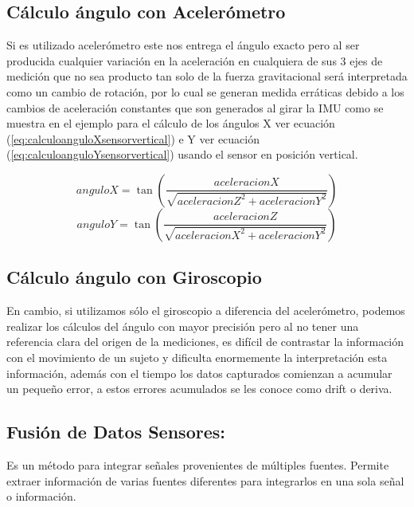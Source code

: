 \documentclass[12pt,a4paper]{article}
\begin{document}
\subsection{Cálculo ángulo con Acelerómetro} Si es utilizado acelerómetro este nos entrega el ángulo exacto pero al ser producida cualquier variación en la aceleración en cualquiera de sus 3 ejes de medición que no sea producto tan solo de la fuerza gravitacional será interpretada como un cambio de rotación, por lo cual se generan medida erráticas debido a los cambios de aceleración constantes que son generados al girar la IMU como se muestra en el ejemplo para el cálculo de los ángulos X ver ecuación (\ref{eq:calculoanguloXsensorvertical}) e Y ver ecuación (\ref{eq:calculoanguloYsensorvertical}) usando el sensor en posición vertical.

\begin{figure}[H]
\begin{equation}
anguloX = \tan{\left(\frac{aceleracionX}{\sqrt{aceleracionZ^{2}+aceleracionY^{2}}}\right)}
\label{eq:calculoanguloXsensorvertical}
\end{equation}
\begin{equation}
anguloY = \tan{\left(\frac{aceleracionZ}{\sqrt{aceleracionX^{2}+aceleracionY^{2}}}\right)}
\label{eq:calculoanguloYsensorvertical}
\end{equation}
\end{figure}

\subsection{Cálculo ángulo con Giroscopio} 
En cambio, si utilizamos sólo el giroscopio a diferencia del acelerómetro, podemos realizar los cálculos del ángulo con mayor precisión pero al no tener una referencia clara del origen de la mediciones, es difícil de contrastar la información con el movimiento de un sujeto y dificulta enormemente la  interpretación esta información, además con el tiempo los datos capturados comienzan a acumular un pequeño error, a estos errores acumulados se les conoce como drift o deriva.


\subsection{Fusión de Datos Sensores:}
Es un método para integrar señales provenientes de múltiples fuentes. Permite extraer información de varias fuentes diferentes para integrarlos en una sola señal o información.
\end{document}
